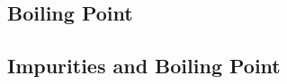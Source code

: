 \begin{multicols}{2}
%
%


\section*{Boiling Point} 


\subsection{Impurities and Boiling Point}



\end{multicols}

